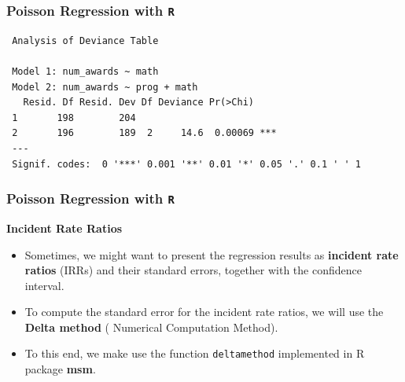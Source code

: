 \documentclass[00-GLMregslides.tex]{subfiles}
\begin{document}
\begin{frame}[fragile]

\frametitle{Poisson Regression with \texttt{R}}


\begin{framed}
\begin{verbatim}
 Analysis of Deviance Table
 
 Model 1: num_awards ~ math
 Model 2: num_awards ~ prog + math
   Resid. Df Resid. Dev Df Deviance Pr(>Chi)    
 1       198        204                         
 2       196        189  2     14.6  0.00069 ***
 ---
 Signif. codes:  0 '***' 0.001 '**' 0.01 '*' 0.05 '.' 0.1 ' ' 1
\end{verbatim}
\end{framed}
\end{frame}

\begin{frame}[fragile]

\frametitle{Poisson Regression with \texttt{R}}
\Large 
\textbf{Incident Rate Ratios}
\begin{itemize}
\item Sometimes, we might want to present the regression results as \textbf{incident rate ratios} (IRRs) and 
their standard errors, together with the confidence interval. 
\item To compute the standard error for the incident rate ratios, we will use the \textbf{Delta method} ( Numerical Computation Method). 
\item To this end, we make use the function \texttt{deltamethod} implemented in R package \textbf{msm}.
\end{itemize}
\end{frame}
\end{document}
